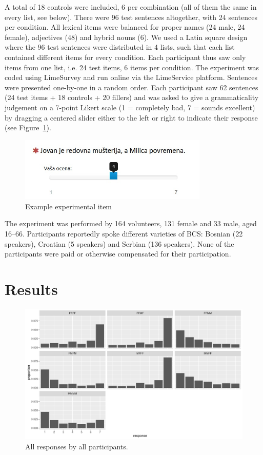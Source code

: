\documentclass[output=paper,
modfonts,
newtxmath,
hidelinks
]{langscibook}
\begin{document}
\noindent A total of 18 controls were included, 6 per combination (all of them the same in every list, see below).			
There were 96 test sentences altogether, with 24 sentences per condition. All lexical items were balanced for proper names (24 male, 24 female), adjectives (48) and hybrid nouns (6).
 We used a Latin square design where the 96 test sentences were distributed in 4 lists, such that each list contained different items for every condition. 
 Each participant thus saw only items from one list, i.e. 24 test items, 6 items per condition. 
 The experiment was coded using LimeSurvey \citep{limesurvey} and run online via the LimeService platform.
  	 Sentences were presented one-by-one in a random order. 
Each participant saw 62 sentences (24 test items + 18 controls + 20 fillers)  
 and was asked to give a grammaticality judgement on a 7-point Likert scale (1 = completely bad, 7 = sounds excellent) by dragging a centered slider either to the left or right to indicate their response (see Figure~\ref{slider}). 
  		
  		\begin{figure}[t]
  			\centering
  			\includegraphics[width=9cm]{figures/14example.jpg}
  			\caption{Example experimental item }
			\label{slider}
  		\end{figure}
 		
 The experiment was performed by 164 volunteers, 131 female and 33 male, aged 16--66. Participants reportedly spoke different varieties of BCS: Bosnian (22 speakers), Croatian (5 speakers) and Serbian (136 speakers).
 None of the participants were paid or otherwise compensated for their participation.

\section{Results}


\begin{figure}[t]
		\centering
		\includegraphics[height=.35\textheight]{figures/14mmmm-resps-1.pdf}
		\caption{All responses by all participants.}\label{fig:all-resps}
	\end{figure}
\end{document}
